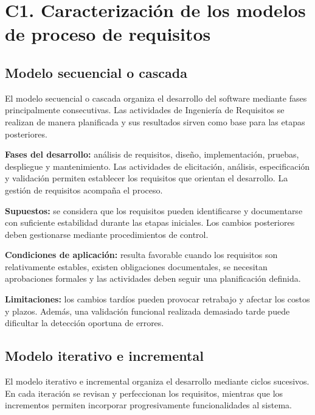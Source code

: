 

\section{C1. Caracterización de los modelos de proceso de requisitos}

\subsection{Modelo secuencial o cascada}

El modelo secuencial o cascada organiza el desarrollo del software mediante fases principalmente consecutivas. Las actividades de Ingeniería de Requisitos se realizan de manera planificada y sus resultados sirven como base para las etapas posteriores.

\textbf{Fases del desarrollo:} análisis de requisitos, diseño, implementación, pruebas, despliegue y mantenimiento. Las actividades de elicitación, análisis, especificación y validación permiten establecer los requisitos que orientan el desarrollo. La gestión de requisitos acompaña el proceso.

\textbf{Supuestos:} se considera que los requisitos pueden identificarse y documentarse con suficiente estabilidad durante las etapas iniciales. Los cambios posteriores deben gestionarse mediante procedimientos de control.

\textbf{Condiciones de aplicación:} resulta favorable cuando los requisitos son relativamente estables, existen obligaciones documentales, se necesitan aprobaciones formales y las actividades deben seguir una planificación definida.

\textbf{Limitaciones:} los cambios tardíos pueden provocar retrabajo y afectar los costos y plazos. Además, una validación funcional realizada demasiado tarde puede dificultar la detección oportuna de errores.

\subsection{Modelo iterativo e incremental}

El modelo iterativo e incremental organiza el desarrollo mediante ciclos sucesivos. En cada iteración se revisan y perfeccionan los requisitos, mientras que los incrementos permiten incorporar progresivamente funcionalidades al sistema.

